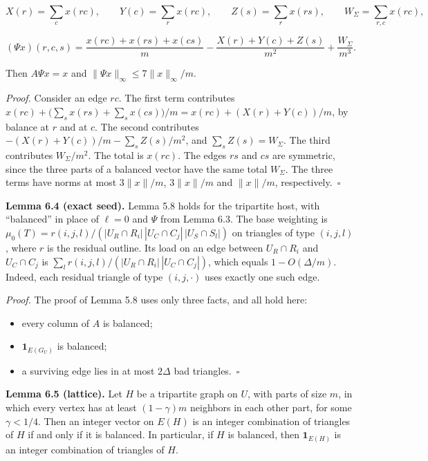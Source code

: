 \documentclass[english,11pt,a4paper]{article}
\providecommand{\tightlist}{\setlength{\itemsep}{0pt}\setlength{\parskip}{0pt}}
\begin{document}
\nopagebreak[4]
\[X(r)=\sum_c x(rc),\qquad Y(c)=\sum_r x(rc),\qquad Z(s)=\sum_r x(rs),\qquad W_\Sigma=\sum_{r,c}x(rc),\]

\nopagebreak[4]
\[(\Psi x)(r,c,s)=\frac{x(rc)+x(rs)+x(cs)}{m}-\frac{X(r)+Y(c)+Z(s)}{m^2}+\frac{W_\Sigma}{m^3}.\]

Then \(A\Psi x=x\) and \(\|\Psi x\|_\infty\le7\|x\|_\infty/m\).

\emph{Proof.} Consider an edge \(rc\). The first term contributes \(x(rc)+\bigl(\sum_s x(rs)+\sum_s x(cs)\bigr)/m=x(rc)+(X(r)+Y(c))/m\), by balance at \(r\) and at \(c\). The second contributes \(-(X(r)+Y(c))/m-\sum_s Z(s)/m^2\), and \(\sum_s Z(s)=W_\Sigma\). The third contributes \(W_\Sigma/m^2\). The total is \(x(rc)\). The edges \(rs\) and \(cs\) are symmetric, since the three parts of a balanced vector have the same total \(W_\Sigma\). The three terms have norms at most \(3\|x\|/m\), \(3\|x\|/m\) and \(\|x\|/m\), respectively.~\(\square\)

\textbf{Lemma 6.4 (exact seed).} Lemma 5.8 holds for the tripartite host, with ``balanced'' in place of \(\ell=0\) and \(\Psi\) from Lemma 6.3. The base weighting is \(\mu_0(T)=r(i,j,l)/(|U_R\cap R_i|\,|U_C\cap C_j|\,|U_S\cap S_l|)\) on triangles of type \((i,j,l)\), where \(r\) is the residual outline. Its load on an edge between \(U_R\cap R_i\) and \(U_C\cap C_j\) is \(\sum_l r(i,j,l)/(|U_R\cap R_i|\,|U_C\cap C_j|)\), which equals \(1-O(\Delta/m)\). Indeed, each residual triangle of type \((i,j,\cdot)\) uses exactly one such edge.

\emph{Proof.} The proof of Lemma 5.8 uses only three facts, and all hold here:

\begin{itemize}
\tightlist
\item
  every column of \(A\) is balanced;
\item
  \(\mathbf 1_{E(G_U)}\) is balanced;
\item
  a surviving edge lies in at most \(2\Delta\) bad triangles.~\(\square\)
\end{itemize}

\textbf{Lemma 6.5 (lattice).} Let \(H\) be a tripartite graph on \(U\), with parts of size \(m\), in which every vertex has at least \((1-\gamma)m\) neighbors in each other part, for some \(\gamma<1/4\). Then an integer vector on \(E(H)\) is an integer combination of triangles of \(H\) if and only if it is balanced. In particular, if \(H\) is balanced, then \(\mathbf 1_{E(H)}\) is an integer combination of triangles of \(H\).
\end{document}
